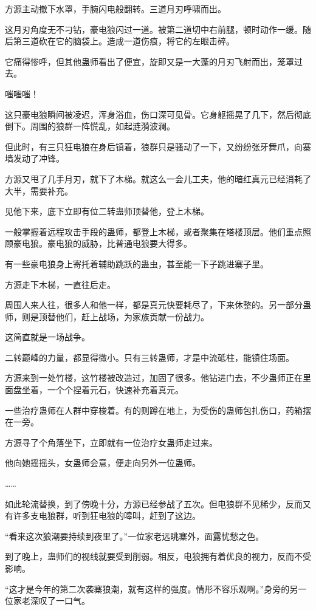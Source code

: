 \begin{this_body}
方源主动撤下水罩，手腕闪电般翻转。三道月刃呼啸而出。

这月刃角度无不刁钻，豪电狼闪过一道。被第二道切中右前腿，顿时动作一缓。随后第三道砍在它的脑袋上。造成一道伤痕，将它的左眼击碎。

它痛得惨呼，但其他蛊师看出了便宜，旋即又是一大蓬的月刃飞射而出，笼罩过去。

嗤嗤嗤！

这只豪电狼瞬间被凌迟，浑身浴血，伤口深可见骨。它身躯摇晃了几下，然后彻底倒下。周围的狼群一阵慌乱，如起涟漪波澜。

但此时，有三只狂电狼在身后镇着，狼群只是骚动了一下，又纷纷张牙舞爪，向寨墙发动了冲锋。

方源又甩了几手月刃，就下了木梯。就这么一会儿工夫，他的暗红真元已经消耗了大半，需要补充。

见他下来，底下立即有位二转蛊师顶替他，登上木梯。

一般掌握着远程攻击手段的蛊师，都登上木梯，或者聚集在塔楼顶层。他们重点照顾豪电狼。豪电狼的威胁，比普通电狼要大得多。

有一些豪电狼身上寄托着辅助跳跃的蛊虫，甚至能一下子跳进寨子里。

方源走下木梯，一直往后走。

周围人来人往，很多人和他一样，都是真元快要耗尽了，下来休整的。另一部分蛊师，则是顶替他们，赶上战场，为家族贡献一份战力。

这简直就是一场战争。

二转巅峰的力量，都显得微小。只有三转蛊师，才是中流砥柱，能镇住场面。

方源来到一处竹楼，这竹楼被改造过，加固了很多。他钻进门去，不少蛊师正在里面盘坐着，一个个捏着元石，快速补充着真元。

一些治疗蛊师在人群中穿梭着。有的则蹲在地上，为受伤的蛊师包扎伤口，药箱摆在一旁。

方源寻了个角落坐下，立即就有一位治疗女蛊师走过来。

他向她摇摇头，女蛊师会意，便走向另外一位蛊师。

……

如此轮流替换，到了傍晚十分，方源已经参战了五次。但电狼群不见稀少，反而又有许多支电狼群，听到狂电狼的嗥叫，赶到了这边。

“看来这次狼潮要持续到夜里了。”一位家老远眺寨外，面露忧愁之色。

到了晚上，蛊师们的视线就要受到削弱。相反，电狼拥有着优良的视力，反而不受影响。

“这才是今年的第二次袭寨狼潮，就有这样的强度。情形不容乐观啊。”身旁的另一位家老深叹了一口气。


\end{this_body}
